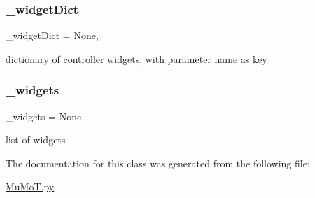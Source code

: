\subsubsection{\texorpdfstring{\+\_\+widget\+Dict}{\_widgetDict}}
{\footnotesize\ttfamily \+\_\+widget\+Dict = None\hspace{0.3cm}{\ttfamily [static]}, {\ttfamily [private]}}



dictionary of controller widgets, with parameter name as key 

\mbox{\label{class_mu_mo_t_1_1_mu_mo_tcontroller_a397d0ee37a222317a1bab7deb1270a13}} 
\subsubsection{\texorpdfstring{\+\_\+widgets}{\_widgets}}
{\footnotesize\ttfamily \+\_\+widgets = None\hspace{0.3cm}{\ttfamily [static]}, {\ttfamily [private]}}



list of widgets 



The documentation for this class was generated from the following file\+:\begin{DoxyCompactItemize}
\item 
\hyperlink{_mu_mo_t_8py}{Mu\+Mo\+T.\+py}\end{DoxyCompactItemize}
